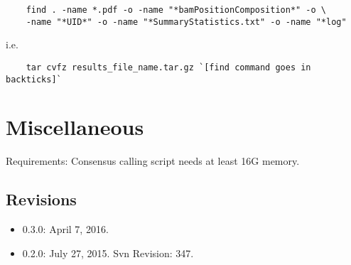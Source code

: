 \documentclass{article}
\begin{document}
\begin{verbatim}
	find . -name *.pdf -o -name "*bamPositionComposition*" -o \
	-name "*UID*" -o -name "*SummaryStatistics.txt" -o -name "*log"
\end{verbatim}

i.e.

\begin{verbatim}
	tar cvfz results_file_name.tar.gz `[find command goes in backticks]`
\end{verbatim}


\section{Miscellaneous}

Requirements:  Consensus calling script needs at least 16G memory.

\subsection{Revisions}

\begin{itemize}
  \item 0.3.0:  April 7, 2016. 
  \item 0.2.0:  July 27, 2015.  Svn Revision: 347.  
\end{itemize}
\end{document}
